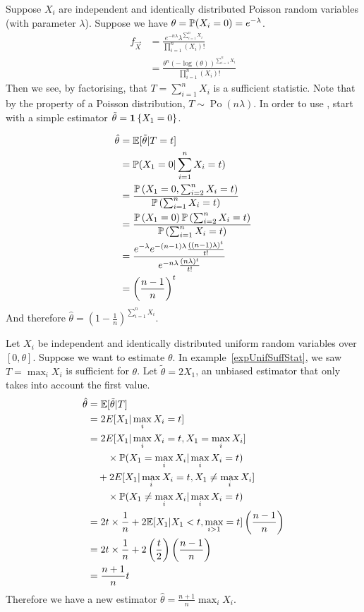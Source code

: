 \documentclass[../Main.tex]{subfiles}
\begin{document}
\begin{example}
    Suppose $X_i$ are independent and identically distributed Poisson random variables (with parameter $\lambda$). Suppose we have $\theta = \P(X_i = 0) = e^{-\lambda}$.
    \begin{align*}
        f_{\vec{X}} &= \frac{e^{-n \lambda} \lambda^{\sum_{i=1}^n X_i}}{\prod_{i=1}^{n} (X_i)!} \\
        &= \frac{\theta^n (-\log(\theta))^{\sum_{i=1}^n X_i}}{\prod_{i=1}^{n} (X_i)!}
    \end{align*}
    Then we see, by factorising, that $T = \sum_{i=1}^{n} X_i$ is a sufficient statistic. Note that by the property of a Poisson distribution, $T \sim \operatorname{Po}(n\lambda)$. In order to use , start with a simple estimator $\tilde{\theta} = \ind{X_1 = 0}$.

    \begin{align*}
        \hat{\theta} &= \E[\tilde{\theta} | T = t] \\
        &= \P(X_1 = 0 | \sum_{i=1}^{n} X_i = t) \\
        &= \frac{\P\left(X_1 = 0, \sum_{i=2}^{n} X_i = t\right)}{\P\left(\sum_{i=1}^{n} X_i = t\right)} \\
        &= \frac{\P\left(X_1 = 0\right)\P\left(\sum_{i=2}^{n} X_i = t\right)}{\P\left(\sum_{i=1}^{n} X_i = t\right)} \\
        &= \frac{e^{-\lambda} e^{-(n-1)\lambda} \frac{((n-1) \lambda)^t}{t!}}{e^{-n\lambda} \frac{(n\lambda)^t}{t!}} \\
        &= \left(\frac{n-1}{n}\right)^t
    \end{align*}
    And therefore $\hat{\theta} = \left(1 - \frac1n\right)^{\sum_{i=1}^n X_i}$.
\end{example}
\begin{example}
    Let $X_i$ be independent and identically distributed uniform random variables over $[0, \theta]$. Suppose we want to estimate $\theta$. In example~\ref{expUnifSuffStat}, we saw $T = \max_i X_i$ is sufficient for $\theta$. Let $\tilde{\theta} = 2X_1$, an unbiased estimator that only takes into account the first value.
    \begin{align*}
        \hat{\theta} &= \E[\tilde{\theta} | T] \\
        &= 2E[X_1 | \max_i X_i = t] \\
        &= 2E[X_1 | \max_i X_i = t, X_1 = \max_i X_i] \\
        &\qquad \times \P(X_1 = \max_i X_i | \max_i X_i = t) \\
        &\quad + 2E[X_1 | \max_i X_i = t, X_1 \neq \max_i X_i] \\
        &\qquad \times \P(X_1 \neq \max_i X_i | \max_i X_i = t) \\
        &= 2t \times \frac1n + 2\E[X_1 | X_1 < t, \max_{i>1} = t] \left(\frac{n-1}{n}\right) \\
        &= 2t \times \frac1n + 2\left(\frac{t}{2}\right) \left(\frac{n-1}{n}\right) \\
        &= \frac{n+1}{n} t
    \end{align*}
    Therefore we have a new estimator $\hat{\theta} = \frac{n+1}{n} \max_i X_i$.
    \label{expUnifMaxEstimator}
\end{example}
\end{document}
